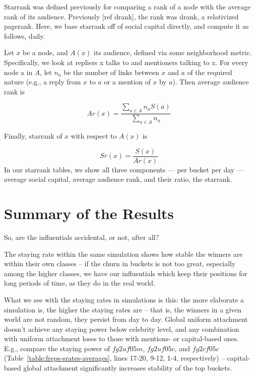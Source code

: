 \documentclass[10pt,oneside]{memoir}
\begin{document}
Starrank was defined previously for comparing a rank of a node with the average rank of its audience.  Previously [ref drank], the rank was drank, a relativized pagerank.  Here, we base starrank off of social capital directly, and compute it as follows, daily.



Let $x$ be a node, and $A(x)$ its audience, defined via some neighborhood metric.  Specifically, we look at repliers x talks to and mentioners talking to x.  For every node a in $A$, let $n_a$ be the number of links between $x$ and $a$ of the required nature (e.g., a reply from $x$ to $a$ or a mention of $x$ by $a$).  Then average audience rank is

\[ Ar(x) = \frac{\sum_{a \in A} n_a S(a)}{\sum_{a \in A} n_a} \]

Finally, starrank of $x$ with respect to $A(x)$ is

\[ Sr(x) = \frac{S(x)}{Ar(x)} \]
In our starrank tables, we show all three components --- per bucket per day --- average social capital, average audience rank, and their ratio, the starrank.


\section{Summary of the Results}
\label{summaryoftheresults}

\label{sec:simulation-results}
So, are the influentials accidental, or not, after all?


The staying rate within the same simulation shows how stable the winners are within their own classes -- if the churn in buckets is not too great, especially among the higher classes, we have our influentials which keep their positions for long periods of time, as they do in the real world.


What we see with the staying rates in simulations is this: the more elaborate a simulation is, the higher the staying rates are -- that is, the winners in a given world are not random, they persist from day to day.  Global uniform attachment doesn't achieve any staying power below celebrity level, and any combination with uniform attachment loses to those with mentions- or capital-based ones.  E.g., compare the staying power of $fg2uf05m$, $fg2uf05c$, and $fg2cf05c$ (Table~\ref{table:freps-srates-averages}, lines 17-20, 9-12, 1-4, respectively) -- capital-based global attachment significantly increases stability of the top buckets.
\end{document}
